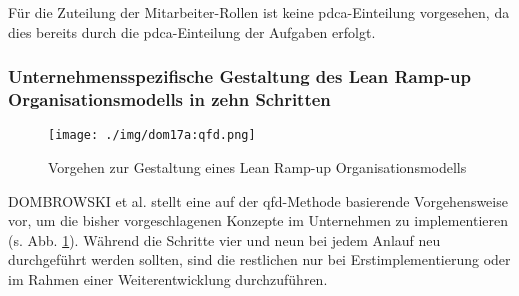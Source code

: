 Für die Zuteilung der Mitarbeiter-Rollen ist keine \gls{pdca}-Einteilung vorgesehen, da dies bereits durch die \gls{pdca}-Einteilung der Aufgaben erfolgt. 


\subsubsection{Unternehmensspezifische Gestaltung des Lean Ramp-up Organisationsmodells in zehn Schritten}\label{sec:zehnschritte}

\begin{figure}[ht]
 \centering
 \texttt{[image: ./img/dom17a:qfd.png]}
 \caption[Vorgehen zur Gestaltung eines Lean Ramp-up Organisationsmodells]{Vorgehen zur Gestaltung eines Lean Ramp-up Organisationsmodells \cite{Dombrowski2017a}}
 \label{fig:dom17a:qfd}
\end{figure}

DOMBROWSKI et al. stellt eine auf der \gls{qfd}-Methode basierende Vorgehensweise vor, um die bisher vorgeschlagenen Konzepte im Unternehmen zu implementieren (s. Abb. \ref{fig:dom17a:qfd}). 
Während die Schritte vier und neun bei jedem Anlauf neu durchgeführt werden sollten, sind die restlichen nur bei Erstimplementierung oder im Rahmen einer Weiterentwicklung durchzuführen. 


